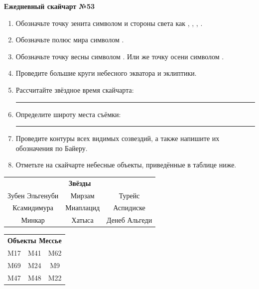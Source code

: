 \documentclass{./SAS-class-skygen}
\begin{document}
    
    
    
	\begin{center}
		\large\textbf{Ежедневный скайчарт №53}
	\end{center}

	\begin{enumerate}
		\item Обозначьте точку зенита символом  и стороны света как , , , .
		\item Обозначьте полюс мира символом .
		\item Обозначьте точку весны символом \Aries. Или же точку осени символом \Libra.
		\item Проведите большие круги небесного экватора и эклиптики.
		\item Рассчитайте звёздное время скайчарта: \rule{2cm}{0.4pt}
		\item Определите широту места съёмки: \rule{2cm}{0.4pt}
		\item Проведите контуры всех видимых созвездий, а также напишите их обозначения по Байеру.
		\item Отметьте на скайчарте небесные объекты, приведённые в таблице ниже.
	\end{enumerate}
	
    \vspace{0.5cm}

    \begin{table}[h!]
    \centering
    \begin{tabular}{ccc}
    \multicolumn{3}{c}{\textbf{Звёзды}} \\ Зубен Эльгенуби & Мирзам & Турейс \\
Ксамидимура & Миаплацид & Аспидиске \\
Минкар & Хатыса & Денеб Альгеди \\

\end{tabular}
    \hfill
    \begin{tabular}{ccc}
    \multicolumn{3}{c}{\textbf{Объекты Мессье}} \\ M17 & M41 & M62 \\
M69 & M24 & M9 \\
M47 & M48 & M22 \\

\end{tabular}
    \end{table}
	
\end{document}
